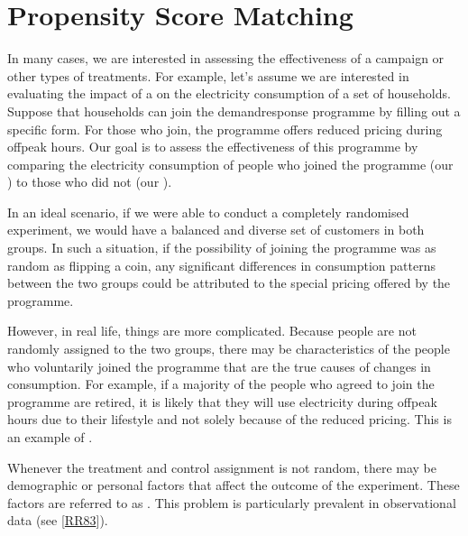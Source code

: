 \documentclass[letterpaper,10pt,english]{jupyterBook}
\begin{document}
\sphinxstepscope


\chapter{Propensity Score Matching}
\label{\detokenize{notebooks/propensity_scores:propensity-score-matching}}\label{\detokenize{notebooks/propensity_scores::doc}}
\sphinxAtStartPar
In many cases, we are interested in assessing the effectiveness of a campaign or other types of treatments. For example, let’s assume we are interested in evaluating the impact of a  on the electricity consumption of a set of households. Suppose that households can join the demand\sphinxhyphen{}response programme by filling out a specific form. For those who join, the programme offers reduced pricing during off\sphinxhyphen{}peak hours. Our goal is to assess the effectiveness of this programme by comparing the electricity consumption of people who joined the programme (our ) to those who did not (our ).

\sphinxAtStartPar
In an ideal scenario, if we were able to conduct a completely randomised experiment, we would have a balanced and diverse set of customers in both groups. In such a situation, if the possibility of joining the programme was as random as flipping a coin, any significant differences in consumption patterns between the two groups could be attributed to the special pricing offered by the programme.

\sphinxAtStartPar
However, in real life, things are more complicated. Because people are not randomly assigned to the two groups, there may be characteristics of the people who voluntarily joined the programme that are the true causes of changes in consumption. For example, if a majority of the people who agreed to join the programme are retired, it is likely that they will use electricity during off\sphinxhyphen{}peak hours due to their lifestyle and not solely because of the reduced pricing. This is an example of .

\sphinxAtStartPar
Whenever the treatment and control assignment is not random, there may be demographic or personal factors that affect the outcome of the experiment. These factors are referred to as . This problem is particularly prevalent in observational data (see {[}\hyperlink{cite.bibliography:id12}{RR83}{]}).
\end{document}
